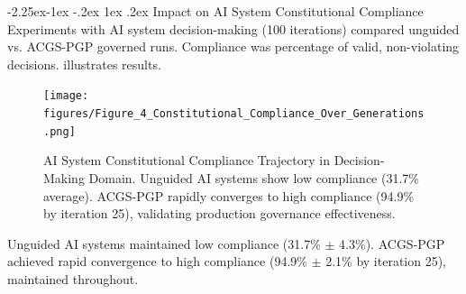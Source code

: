 \documentclass[manuscript,screen,9pt]{acmart}
\makeatletter
\renewcommand\subsection{\@startsection{subsection}{2}{\z@}%
  {-2.25ex\@plus -1ex \@minus -.2ex}%
  {1ex \@plus .2ex}%
  {\normalfont\large\bfseries}}
\makeatother
\begin{document}
\subsection{Impact on AI System Constitutional Compliance}
\label{subsec:impact_compliance}
Experiments with AI system decision-making (100 iterations) compared unguided vs. ACGS-PGP governed runs. Compliance was percentage of valid, non-violating decisions.  illustrates results.
\FloatBarrier %
\begin{figure}[!htb]
	\centering
	\texttt{[image: figures/Figure\_4\_Constitutional\_Compliance\_Over\_Generations.png]}
	\caption[AI System Constitutional Compliance Trajectory]{AI System Constitutional Compliance Trajectory in Decision-Making Domain. Unguided AI systems show low compliance (31.7\% average). ACGS-PGP rapidly converges to high compliance (94.9\% by iteration 25), validating production governance effectiveness.}
	\label{fig:compliance_over_generations}
\end{figure}
Unguided AI systems maintained low compliance (31.7\% $\pm$ 4.3\%). ACGS-PGP achieved rapid convergence to high compliance (94.9\% $\pm$ 2.1\% by iteration 25), maintained throughout.
\end{document}
